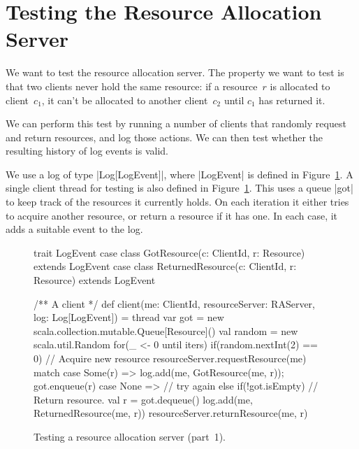 \section{Testing the Resource Allocation Server}

We want to test the resource allocation server.  The property
we want to test is that two clients never hold the same resource: if a
resource~$r$ is allocated to client~$c_1$, it can't be allocated to another
client~$c_2$ until $c_1$ has returned it.

We can perform this test by running a number of clients that randomly request
and return resources, and log those actions.  We can then test whether the
resulting history of log events is valid.



We use a log of type |Log[LogEvent]|, where |LogEvent| is
defined in Figure~\ref{fig:RATest-1}.
%
A single client thread for testing is also defined in
Figure~\ref{fig:RATest-1}.   This uses a
queue |got| to keep track of the resources it currently holds.  On each
iteration it either tries to acquire another resource, or return a resource if
it has one.  In each case, it adds a suitable event to the log.

\begin{figure}
\begin{scala}
  trait LogEvent
  case class GotResource(c: ClientId, r: Resource) extends LogEvent
  case class ReturnedResource(c: ClientId, r: Resource) extends LogEvent

  /** A client */
  def client(me: ClientId, resourceServer: RAServer, log: Log[LogEvent]) = thread{
    var got = new scala.collection.mutable.Queue[Resource]()
    val random = new scala.util.Random
    for(_ <- 0 until iters){
      if(random.nextInt(2) == 0){ // Acquire new resource
	resourceServer.requestResource(me) match{
          case Some(r) =>  log.add(me, GotResource(me, r)); got.enqueue(r)
          case None => {}  // try again
        }
      }
      else if(!got.isEmpty){     // Return resource.
	val r = got.dequeue()
        log.add(me, ReturnedResource(me, r))
	resourceServer.returnResource(me, r)
      }
    }
  }
\end{scala}
\caption{Testing a resource allocation server (part~1).}
\label{fig:RATest-1}
\end{figure}

